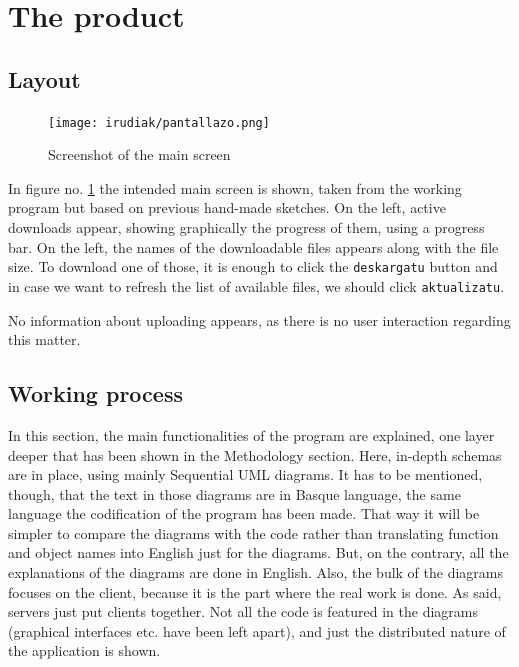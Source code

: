 \section{The product}

\subsection{Layout}
\begin{figure}
   \centering
   \texttt{[image: irudiak/pantallazo.png]}
   \caption{Screenshot of the main screen}
   \label{fig:pantailazo}
\end{figure} 

In figure no. \ref{fig:pantailazo} the intended main screen is shown, taken from the working program but based on previous hand-made sketches. On the left, active downloads appear, showing graphically the progress of them, using a progress bar. On the left, the names of the downloadable files appears along with the file size. To download one of those, it is enough to click the \texttt{deskargatu} button and in case we want to refresh the list of available files, we should click \texttt{aktualizatu}.

No information about uploading appears, as there is no user interaction regarding this matter.

\subsection{Working process}
In this section, the main functionalities of the program are explained, one layer deeper that has been shown in the Methodology section. Here, in-depth schemas are in place, using mainly Sequential UML diagrams. It has to be mentioned, though, that the text in those diagrams are in Basque language, the same language the codification of the program has been made. That way it will be simpler to compare the diagrams with the code rather than translating function and object names into English just for the diagrams. But, on the contrary, all the explanations of the diagrams are done in English. Also, the bulk of the diagrams focuses on the client, because it is the part where the real work is done. As said, servers just put clients together. Not all the code is featured in the diagrams (graphical interfaces etc. have been left apart), and just the distributed nature of the application is shown.

